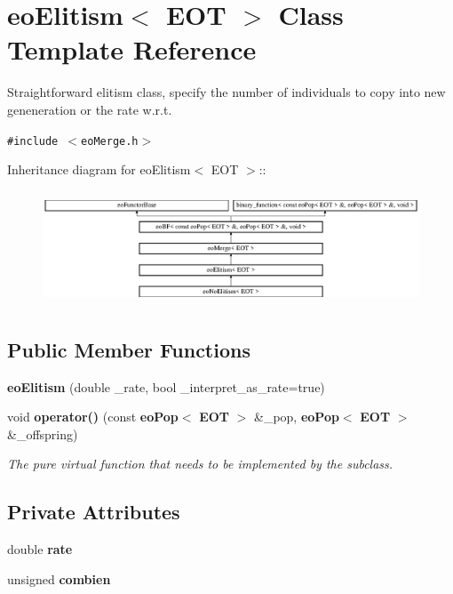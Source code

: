 \section{eo\-Elitism$<$ EOT $>$ Class Template Reference}
\label{classeo_elitism}
Straightforward elitism class, specify the number of individuals to copy into new geneneration or the rate w.r.t.  


{\tt \#include $<$eo\-Merge.h$>$}

Inheritance diagram for eo\-Elitism$<$ EOT $>$::\begin{figure}[H]
\begin{center}
\leavevmode
\includegraphics[height=3.4398cm]{classeo_elitism}
\end{center}
\end{figure}
\subsection*{Public Member Functions}
\begin{CompactItemize}
\item 
{\bf eo\-Elitism} (double \_\-rate, bool \_\-interpret\_\-as\_\-rate=true)\label{classeo_elitism_a0}

\item 
void {\bf operator()} (const {\bf eo\-Pop}$<$ {\bf EOT} $>$ \&\_\-pop, {\bf eo\-Pop}$<$ {\bf EOT} $>$ \&\_\-offspring)\label{classeo_elitism_a1}

\begin{CompactList}\small\item\em The pure virtual function that needs to be implemented by the subclass. \item\end{CompactList}\end{CompactItemize}
\subsection*{Private Attributes}
\begin{CompactItemize}
\item 
double {\bf rate}\label{classeo_elitism_r0}

\item 
unsigned {\bf combien}\label{classeo_elitism_r1}

\end{CompactItemize}


